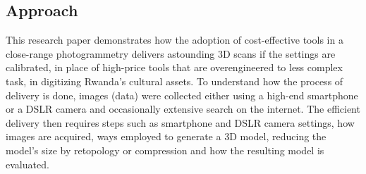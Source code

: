 \documentclass[a4paper, 12pt]{article}
\begin{document}
\subsection{Approach}

This research paper demonstrates how the adoption of cost-effective tools in a close-range photogrammetry delivers astounding 3D scans if the settings are calibrated, in place of high-price tools that are overengineered to less complex task, in digitizing Rwanda's cultural assets. To understand how the process of delivery is done, images (data) were collected either using a high-end smartphone or a DSLR camera and occasionally extensive search on the internet. The efficient delivery then requires steps such as smartphone and DSLR camera settings, how images are acquired, ways employed to generate a 3D model, reducing the model's size by retopology or compression and how the resulting model is evaluated.

\end{document}
